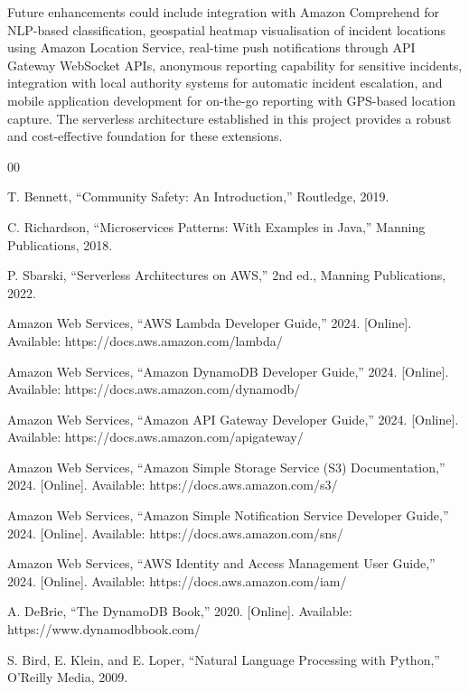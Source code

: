 \documentclass[conference]{IEEEtran}
\begin{document}
Future enhancements could include integration with Amazon Comprehend for NLP-based classification, geospatial heatmap visualisation of incident locations using Amazon Location Service, real-time push notifications through API Gateway WebSocket APIs, anonymous reporting capability for sensitive incidents, integration with local authority systems for automatic incident escalation, and mobile application development for on-the-go reporting with GPS-based location capture. The serverless architecture established in this project provides a robust and cost-effective foundation for these extensions.

\begin{thebibliography}{00}

 T. Bennett, ``Community Safety: An Introduction,'' Routledge, 2019.

 C. Richardson, ``Microservices Patterns: With Examples in Java,'' Manning Publications, 2018.

 P. Sbarski, ``Serverless Architectures on AWS,'' 2nd ed., Manning Publications, 2022.

 Amazon Web Services, ``AWS Lambda Developer Guide,'' 2024. [Online]. Available: https://docs.aws.amazon.com/lambda/

 Amazon Web Services, ``Amazon DynamoDB Developer Guide,'' 2024. [Online]. Available: https://docs.aws.amazon.com/dynamodb/

 Amazon Web Services, ``Amazon API Gateway Developer Guide,'' 2024. [Online]. Available: https://docs.aws.amazon.com/apigateway/

 Amazon Web Services, ``Amazon Simple Storage Service (S3) Documentation,'' 2024. [Online]. Available: https://docs.aws.amazon.com/s3/

 Amazon Web Services, ``Amazon Simple Notification Service Developer Guide,'' 2024. [Online]. Available: https://docs.aws.amazon.com/sns/

 Amazon Web Services, ``AWS Identity and Access Management User Guide,'' 2024. [Online]. Available: https://docs.aws.amazon.com/iam/

 A. DeBrie, ``The DynamoDB Book,'' 2020. [Online]. Available: https://www.dynamodbbook.com/

 S. Bird, E. Klein, and E. Loper, ``Natural Language Processing with Python,'' O'Reilly Media, 2009.

\end{thebibliography}
\end{document}
